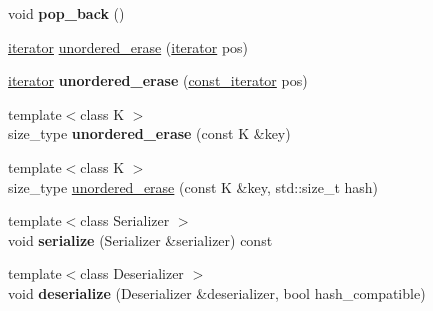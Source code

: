 \begin{DoxyCompactItemize}
\item 
\mbox{\label{classtsl_1_1detail__ordered__hash_1_1ordered__hash_ab01d3e8d15a267984a62c7a91890d334}} 
void {\bfseries pop\+\_\+back} ()
\item 
\mbox{\hyperlink{classtsl_1_1detail__ordered__hash_1_1ordered__hash_1_1ordered__iterator}{iterator}} \mbox{\hyperlink{classtsl_1_1detail__ordered__hash_1_1ordered__hash_a21c48865fa368540903475db8ac6ca9e}{unordered\+\_\+erase}} (\mbox{\hyperlink{classtsl_1_1detail__ordered__hash_1_1ordered__hash_1_1ordered__iterator}{iterator}} pos)
\item 
\mbox{\label{classtsl_1_1detail__ordered__hash_1_1ordered__hash_aeb03c12aa9544721c779ba1bf6aa4209}} 
\mbox{\hyperlink{classtsl_1_1detail__ordered__hash_1_1ordered__hash_1_1ordered__iterator}{iterator}} {\bfseries unordered\+\_\+erase} (\mbox{\hyperlink{classtsl_1_1detail__ordered__hash_1_1ordered__hash_1_1ordered__iterator}{const\+\_\+iterator}} pos)
\item 
\mbox{\label{classtsl_1_1detail__ordered__hash_1_1ordered__hash_a7c8729fc8f47b0f953bbad7519b13f7d}} 
{\footnotesize template$<$class K $>$ }\\size\+\_\+type {\bfseries unordered\+\_\+erase} (const K \&key)
\item 
{\footnotesize template$<$class K $>$ }\\size\+\_\+type \mbox{\hyperlink{classtsl_1_1detail__ordered__hash_1_1ordered__hash_a46db26df8d9104bf7b9dc80fe10101e9}{unordered\+\_\+erase}} (const K \&key, std\+::size\+\_\+t hash)
\item 
\mbox{\label{classtsl_1_1detail__ordered__hash_1_1ordered__hash_a5d0140b0748a09e4a70ee93df942d9ca}} 
{\footnotesize template$<$class Serializer $>$ }\\void {\bfseries serialize} (Serializer \&serializer) const
\item 
\mbox{\label{classtsl_1_1detail__ordered__hash_1_1ordered__hash_a9f8c19e9299e02625f7cf94c46df395b}} 
{\footnotesize template$<$class Deserializer $>$ }\\void {\bfseries deserialize} (Deserializer \&deserializer, bool hash\+\_\+compatible)
\end{DoxyCompactItemize}

